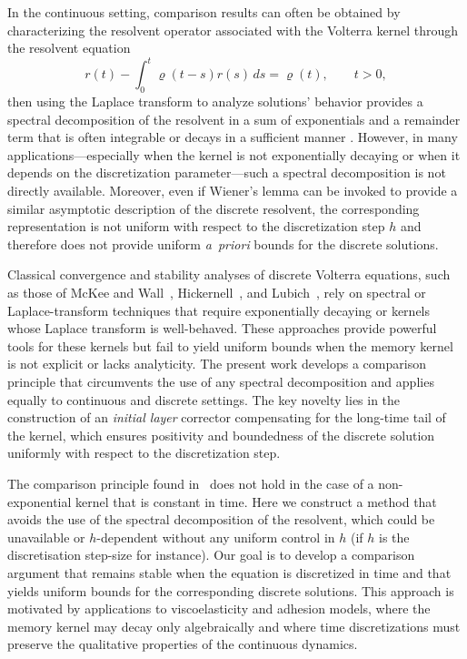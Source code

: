 \documentclass[]{jnsao}
\newcommand{\kernel}{\varrho}
\begin{document}
In the continuous setting, comparison results can often be obtained by characterizing 
the resolvent operator associated with the Volterra kernel through the resolvent equation
\[r(t) - \int_0^t \kernel	(t-s) r(s)\,ds = \kernel(t), \qquad t > 0,\]
then using the Laplace transform to analyze solutions' behavior provides a spectral
decomposition of the resolvent in a sum of exponentials and a remainder term that
is often integrable or decays in a sufficient manner \cite[Ch.~4 \& 7]{grip}. 
However, in many applications—especially when the kernel is not exponentially decaying or when it depends on 
the discretization parameter—such a spectral decomposition is not directly available. Moreover, 
even if Wiener’s lemma can be invoked to provide a similar asymptotic description of the discrete resolvent, 
the corresponding representation is not uniform with respect to the discretization step $h$ 
and therefore does not provide uniform \emph{a~priori} bounds for the discrete solutions.






Classical convergence and stability analyses of discrete Volterra equations, 
such as those of McKee and Wall~\cite{JonesMcKee1982}, Hickernell~\cite{BakkeJackiewicz1988}, 
and Lubich~\cite{Lu.88.1,Lu.88.2}, rely on spectral or Laplace-transform techniques that 
require exponentially decaying or  kernels whose Laplace transform is well-behaved. 
These approaches provide powerful tools 
for these kernels but fail to yield uniform bounds when the memory kernel is not explicit 
or lacks analyticity. The present work develops a comparison principle that 
circumvents the use of any spectral decomposition and applies equally to continuous and 
discrete settings. The key novelty lies in the construction of an {\em initial layer} 
corrector compensating for the long-time tail of the kernel, which ensures positivity 
and boundedness of the discrete solution uniformly with respect to the discretization step. 


The comparison principle found in~\cite[Theorem~2.7]{MiOel.1} does not hold in the case of a 
non-exponential kernel that is constant in time. Here we construct a method that avoids the 
use of the spectral decomposition of the resolvent, which could be unavailable or $h$-dependent
without any uniform control in $h$ (if $h$ is the discretisation step-size for instance). 
Our goal is to develop a comparison argument that remains stable when 
the equation is discretized in time and that yields uniform bounds for the corresponding 
discrete solutions. This approach is motivated by applications to viscoelasticity and 
adhesion models, where the memory kernel may decay only algebraically and where time 
discretizations must preserve the qualitative properties of the continuous dynamics.
\end{document}
